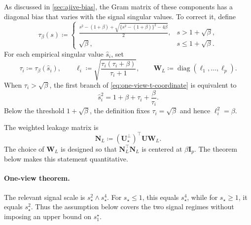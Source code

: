 \documentclass[11pt]{article}
\newcommand{\trans}{\top}
\DeclareMathOperator{\diag}{diag}
\begin{document}
As discussed in \cref{sec:ajive-bias}, the Gram matrix of these components
has a diagonal bias that varies with the signal singular values.  To correct
it, define
\begin{equation}
\label{eq:one-view-t-coordinate}
  \tau_\beta(s)
  \coloneqq
  \begin{cases}
  \displaystyle
  \frac{
    s^2-(1+\beta)
    +
    \sqrt{\{s^2-(1+\beta)\}^2-4\beta}
  }{2},
  &
  s>1+\sqrt\beta,
  \\[8pt]
  \sqrt\beta,
  &
  s\le1+\sqrt\beta.
  \end{cases}
\end{equation}
For each empirical singular value $\widehat s_i$, set
\[
  \tau_i\coloneqq\tau_\beta(\widehat s_i),
  \qquad
  \ell_i
  \coloneqq
  \sqrt{\frac{\tau_i(\tau_i+\beta)}{\tau_i+1}},
  \qquad
  \bm W_L\coloneqq\diag(\ell_1,\ldots,\ell_p).
\]
When $\tau_i>\sqrt\beta$, the first branch of
\cref{eq:one-view-t-coordinate} is equivalent to
\begin{equation}
\label{eq:one-view-upper-branch-relation}
  \widehat s_i^2
  =
  1+\beta+\tau_i+\frac{\beta}{\tau_i}.
\end{equation}
Below the threshold $1+\sqrt\beta$, the definition fixes
$\tau_i=\sqrt\beta$ and hence $\ell_i^2=\beta$.

The weighted leakage matrix is
\begin{equation}
\label{eq:one-view-NL}
  \bm N_L
  \coloneqq
  (\bm U_\star^\perp)^\trans\bm U\bm W_L.
\end{equation}
The choice of $\bm W_L$ is designed so that
$\bm N_L^\trans\bm N_L$ is centered at $\beta\bm I_p$.  The theorem below
makes this statement quantitative.

\paragraph{One-view theorem.}

The relevant signal scale is
$s_\star^2\wedge s_\star^4$.  For $s_\star\le1$, this equals
$s_\star^4$, while for $s_\star\ge1$, it equals $s_\star^2$.  Thus the
assumption below covers the two signal regimes without imposing an upper
bound on $s_1^\star$.
\end{document}

